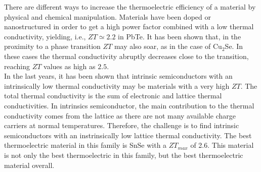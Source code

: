 There are different ways to increase the thermoelectric efficiency of a material by physical and chemical 
manipulation. Materials have been doped\cite{kim2013engineered,pei2011stabilizing,heremans2008enhancement} or
nanostructured\cite{vineis2010nanostructured,minnich2009bulk} in order to get a high power factor combined with a 
low thermal conductivity, yielding, i.e., $ZT\simeq 2.2$ in PbTe\cite{hsu2004cubic}. It has been shown that, in the 
proximity to a phase transition $ZT$ may also soar, as in the case of Cu$_{2}$Se\cite{liu2013ultrahigh}. In these 
cases the thermal conductivity abruptly decreases close to the transition, reaching $ZT$ values as high as $2.5$. \\

In the last years, it has been shown that intrinsic semiconductors with an intrinsically low thermal conductivity 
may be materials with a very high $ZT$\cite{zhao2014ultralow,he2018remarkable}. The total thermal conductivity is 
the sum of electronic and lattice thermal conductivities. In intrinsics semiconductor, the main contribution to the 
thermal conductivity comes from the lattice as there are not many available charge carriers at normal temperatures. 
Therefore, the challenge is to find intrinsic semiconductors with an instrinsically low lattice thermal conductivity. 
The best thermoelectric material in this family is SnSe\cite{zhao2014ultralow} with a $ZT_{max}$ of 2.6. This 
material is not only the best thermoelectric in this family, but the best thermoelectric material overall. \\

